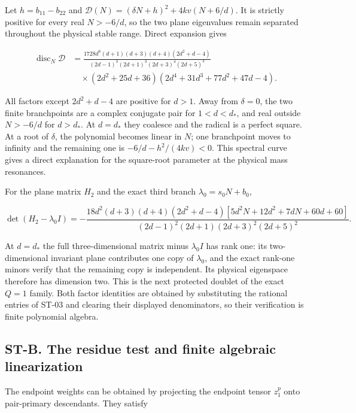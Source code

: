 Let \(h=b_{11}-b_{22}\) and \(\mathcal D(N)=(\delta N+h)^2+4kv(N+6/d)\). It is strictly positive for every real \(N>-6/d\), so the two plane eigenvalues remain separated throughout the physical stable range. Direct expansion gives

\[
\begin{aligned}
\operatorname{disc}_N\mathcal D&=
\frac{1728d^6(d+1)(d+3)(d+4)(2d^2+d-4)}
{(2d-1)^3(2d+1)^3(2d+3)^4(2d+5)^4}\\
&\quad\times(2d^2+25d+36)(2d^4+31d^3+77d^2+47d-4).
\end{aligned}
\]

All factors except \(2d^2+d-4\) are positive for \(d>1\). Away from \(\delta=0\), the two finite branchpoints are a complex conjugate pair for \(1<d<d_*\), and real outside \(N>-6/d\) for \(d>d_*\). At \(d=d_*\) they coalesce and the radical is a perfect square. At a root of \(\delta\), the polynomial becomes linear in \(N\); one branchpoint moves to infinity and the remaining one is \(-6/d-h^2/(4kv)<0\). This spectral curve gives a direct explanation for the square-root parameter at the physical mass resonances.

For the plane matrix \(H_2\) and the exact third branch \(\lambda_0=s_0N+b_0\),

\[
\det(H_2-\lambda_0I)=
-\frac{18d^2(d+3)(d+4)(2d^2+d-4)
[5d^2N+12d^2+7dN+60d+60]}
{(2d-1)^2(2d+1)(2d+3)^2(2d+5)^2}.
\]

At \(d=d_*\) the full three-dimensional matrix minus \(\lambda_0I\) has rank one: its two-dimensional invariant plane contributes one copy of \(\lambda_0\), and the exact rank-one minors verify that the remaining copy is independent. Its physical eigenspace therefore has dimension two. This is the next protected doublet of the exact \(Q=1\) family. Both factor identities are obtained by substituting the rational entries of ST-03 and clearing their displayed denominators, so their verification is finite polynomial algebra.

\hypertarget{st-b.-the-residue-test-and-finite-algebraic-linearization}{%
\subsection{ST-B. The residue test and finite algebraic linearization}\label{st-b.-the-residue-test-and-finite-algebraic-linearization}}

The endpoint weights can be obtained by projecting the endpoint tensor \(z_1^p\) onto pair-primary descendants. They satisfy

